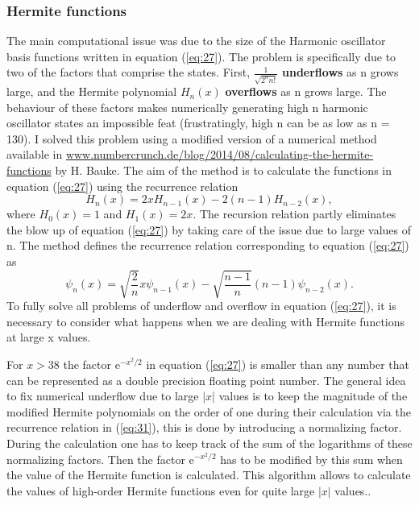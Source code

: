 \documentclass[10pt, a4paper, singlespacing]{report}
\begin{document}
\subsubsection{Hermite functions}\label{Hermite functions}
The main computational issue was due to the size of the Harmonic oscillator basis functions written in equation (\ref{eq:27}). The problem is specifically due to two of the factors that comprise the states. First, $\frac{1}{\sqrt{2^n n!}}$ \textbf{underflows} as n grows large, and the Hermite polynomial $H_n(x)$ \textbf{overflows} as n grows large. The behaviour of these factors makes numerically generating high n harmonic oscillator states an impossible feat (frustratingly, high n can be as low as n = 130).
I solved this problem using a modified version of a numerical method available in \url{www.numbercrunch.de/blog/2014/08/calculating-the-hermite-functions} by H. Bauke. The aim of the method is to calculate the functions in equation (\ref{eq:27}) using the recurrence relation 
\begin{equation} \label{eq:30}
H_n(x) = 2xH_{n-1}(x) - 2(n-1)H_{n-2}(x),
\end{equation}
where $H_0(x) = 1 $ and $H_1(x) = 2x$. The recursion relation partly eliminates the blow up of equation (\ref{eq:27}) by taking care of the issue due to large values of n. The method defines the recurrence relation corresponding to equation (\ref{eq:27}) as 
\begin{equation} \label{eq:31}
\psi_n(x) = \sqrt{\frac{2}{n}}x\psi_{n-1}(x) - \sqrt{\frac{n-1}{n}}(n-1)\psi_{n-2}(x).
\end{equation}
To fully solve all problems of underflow and overflow in equation (\ref{eq:27}), it is necessary to consider what happens when we are dealing with Hermite functions at large x values.

For $x>38$ the factor $\mathrm{e}^{-x^2/2}$ in equation (\ref{eq:27}) is smaller than any number that can be represented as a double precision floating point number. The general idea to fix numerical underflow due to large $|x|$ values is to keep the magnitude of the modified Hermite polynomials on the order of one during their calculation via the recurrence relation in (\ref{eq:31}), this is done by introducing a normalizing factor. During the calculation one has to keep track of the sum of the logarithms of these normalizing factors. Then the factor $\mathrm{e}^{-x^2/2}$ has to be modified by this sum when the value of the Hermite function is calculated. This algorithm allows to calculate the values of high-order Hermite functions even for quite large $|x|$ values.\cite{Bauke}.
\end{document}
